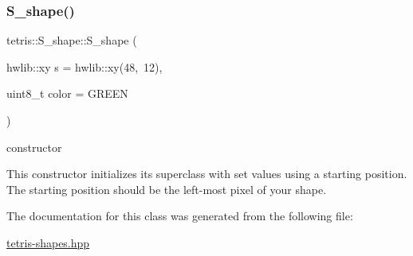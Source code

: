 \subsubsection{\texorpdfstring{S\+\_\+shape()}{S\_shape()}}
{\footnotesize\ttfamily tetris\+::\+S\+\_\+shape\+::\+S\+\_\+shape (\begin{DoxyParamCaption}\item[{hwlib\+::xy}]{s = {\ttfamily hwlib\+:\+:xy(48,~12)},  }\item[{uint8\+\_\+t}]{color = {\ttfamily GREEN} }\end{DoxyParamCaption})\hspace{0.3cm}{\ttfamily [inline]}}



constructor 

This constructor initializes its superclass with set values using a starting position. The starting position should be the left-\/most pixel of your shape. 

The documentation for this class was generated from the following file\+:\begin{DoxyCompactItemize}
\item 
\hyperlink{tetris-shapes_8hpp}{tetris-\/shapes.\+hpp}\end{DoxyCompactItemize}
